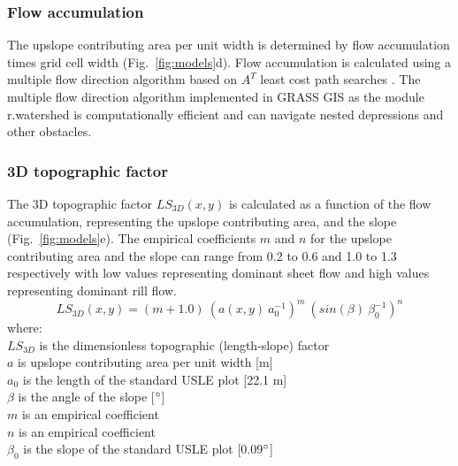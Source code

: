\documentclass[gmd, manuscript]{copernicus}
\begin{document}

\subsubsection{Flow accumulation}

The upslope contributing area per unit width 
is determined by flow accumulation times grid cell width
(Fig.~\ref{fig:models}d). 
Flow accumulation is calculated using a multiple flow direction algorithm \citep{Metz2009} 
based on $A^{T}$ least cost path searches \citep{Ehlschlaeger1989}. 
The multiple flow direction algorithm 
implemented in GRASS GIS as the module r.watershed
is computationally efficient and can
navigate nested depressions and other obstacles. 


\subsubsection{3D topographic factor}

The 3D topographic factor $LS_{3D}(x,y)$
is calculated as a function of 
the flow accumulation,
representing the upslope contributing area,
and the slope 
(Fig.~\ref{fig:models}e). 
%
The empirical coefficients $m$ and $n$
for the upslope contributing area 
and the slope
can range from 0.2 to 0.6
and 1.0 to 1.3 respectively
with low values representing dominant sheet flow
and high values representing dominant rill flow.
%
\begin{equation}
\label{eq:ls_factor}
{LS_{3D}(x,y) = (m+1.0) ~ (a(x,y) ~ a_0^{-1})^{m} ~ (sin(\beta) ~ \beta_0^{-1})^{n}}
\end{equation}
%
{\small
\noindent
where: \\
\noindent
\hspace*{0.5em} $LS_{3D}$ is the dimensionless topographic (length-slope) factor\\
\hspace*{0.5em} $a$ is upslope contributing area per unit width [\unit{m}]\\
\hspace*{0.5em} $a_0$ is the length of the standard USLE plot [22.1 \unit{m}]\\
\hspace*{0.5em} $\beta$ is the angle of the slope [$^{\circ}$]\\
\hspace*{0.5em} $m$ is an empirical coefficient\\
\hspace*{0.5em} $n$ is an empirical coefficient\\
\hspace*{0.5em} $\beta_0$ is the slope of the standard USLE plot [0.09$^{\circ}$]\\
}
\end{document}
